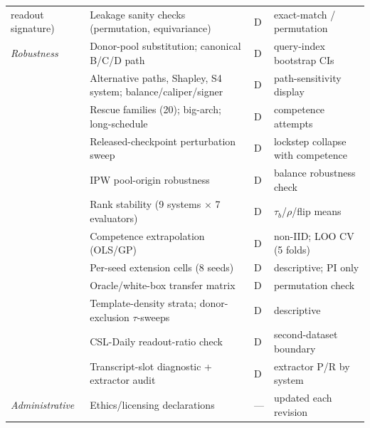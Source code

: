 \documentclass[pdflatex,sn-chicago]{sn-jnl}
\begin{document}
\begin{table}[h]
\begin{tabular}{p{2.5cm}p{5.0cm}p{0.9cm}p{3.6cm}}
  readout signature) & Leakage sanity checks (permutation, equivariance) & D & exact-match / permutation \\
\addlinespace
\emph{Robustness} & Donor-pool substitution; canonical B/C/D path & D & query-index bootstrap CIs \\
 & Alternative paths, Shapley, S4 system; balance/caliper/signer & D & path-sensitivity display \\
 & Rescue families (20); big-arch; long-schedule & D & competence attempts \\
 & Released-checkpoint perturbation sweep & D & lockstep collapse with competence \\
 & IPW pool-origin robustness & D & balance robustness check \\
 & Rank stability (9 systems $\times$ 7 evaluators) & D & $\tau_b$/$\rho$/flip means \\
 & Competence extrapolation (OLS/GP) & D & non-IID; LOO CV (5 folds) \\
 & Per-seed extension cells (8 seeds) & D & descriptive; PI only \\
 & Oracle/white-box transfer matrix & D & permutation check \\
 & Template-density strata; donor-exclusion $\tau$-sweeps & D & descriptive \\
 & CSL-Daily readout-ratio check & D & second-dataset boundary \\
 & Transcript-slot diagnostic + extractor audit & D & extractor P/R by system \\
\addlinespace
\emph{Administrative} & Ethics/licensing declarations & --- & updated each revision \\
\bottomrule
\end{tabular}
\end{table}
\end{document}
